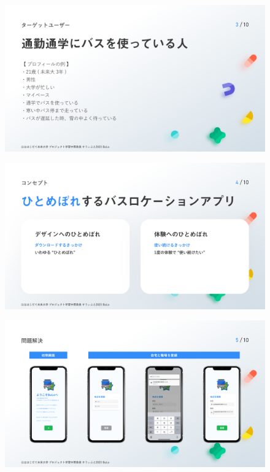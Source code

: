 \begin{figure}[H]
    \includegraphics[width=14cm]{images/slide3.png}
    \label{fig:slide3}
\end{figure}
\begin{figure}[H]
    \includegraphics[width=14cm]{images/slide4.png}
    \label{fig:slide4}
\end{figure}
\begin{figure}[H]
    \includegraphics[width=14cm]{images/slide5.png}
    \label{fig:slide5}
\end{figure}
